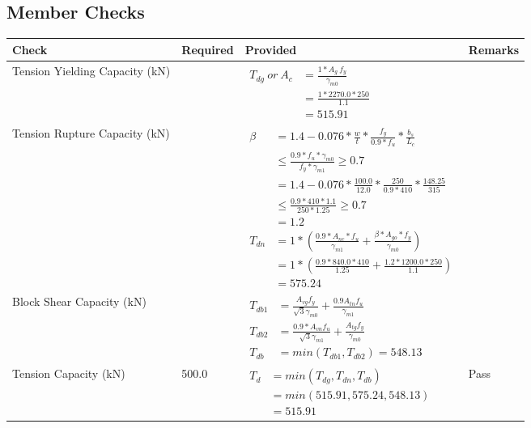 \documentclass{article}%
\begin{document}
\subsection{Member Checks}%
\label{subsec:MemberChecks}%
\renewcommand{\arraystretch}{1.2}%
\begin{longtable}{|p{2.5cm}|p{4.5cm}|p{8cm}|p{1cm}|}%
\hline%
\rowcolor{OsdagGreen}%
Check&Required&Provided&Remarks\\%
\hline%
\endhead%
\hline%
Tension Yielding Capacity (kN)&&$\begin{aligned}T_{dg}~or~A_c&= \frac{1 * A_g ~ f_y}{\gamma_{m0}}\\ &= \frac{1*2270.0*250}{1.1}\\ &= 515.91\end{aligned}$&\\%
\hline%
Tension Rupture Capacity (kN)&&$\begin{aligned}\beta &= 1.4 - 0.076*\frac{w}{t}*\frac{f_{y}}{0.9*f_{u}}*\frac{b_s}{L_c}\\ &\leq\frac{0.9*f_{u}*\gamma_{m0}}{f_{y}*\gamma_{m1}} \geq 0.7 \\ &= 1.4 - 0.076*\frac{100.0}{12.0}*\frac{250}{0.9*410}*\frac{148.25}{315 }\\ &\leq\frac{0.9* 410*1.1}{250*1.25} \geq 0.7 \\ &= 1.2\\ T_{dn} &= 1*(\frac{0.9*A_{nc}*f_{u}}{\gamma_{m1}} + \frac{\beta * A_{go} * f_{y}}{\gamma_{m0}})\\ &= 1*(\frac{0.9* 840.0*410}{1.25} + \frac{1.2*1200.0*250}{1.1})\\ &= 575.24\end{aligned}$&\\%
\hline%
Block Shear Capacity (kN)&&$\begin{aligned}T_{db1} &= \frac{A_{vg} f_{y}}{\sqrt{3} \gamma_{m0}} + \frac{0.9 A_{tn} f_{u}}{\gamma_{m1}}\\ T_{db2} &= \frac{0.9*A_{vn} f_{u}}{\sqrt{3} \gamma_{m1}} + \frac{A_{tg} f_{y}}{\gamma_{m0}}\\ T_{db} &= min(T_{db1}, T_{db2})= 548.13\end{aligned}$&\\%
\hline%
Tension Capacity (kN)&500.0&$\begin{aligned} T_d &= min(T_{dg},T_{dn},T_{db})\\ &= min(515.91,575.24,548.13)\\ &=515.91\end{aligned}$&Pass\\%

\end{longtable}
\end{document}
